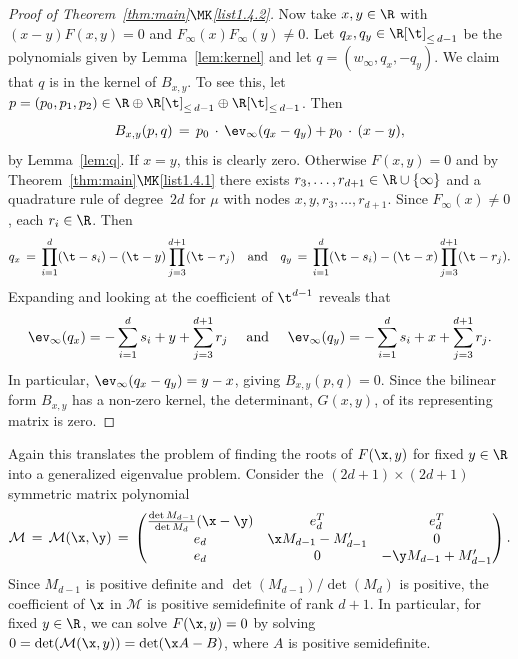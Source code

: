 \begin{proof}[Proof of Theorem~\ref{thm:main}$\MK$\eqref{list1.4.2}]
Now take $x, y\in \R$ with $(x-y)F(x,y)=0$ and $F_{\infty}(x)F_{\infty}(y)\neq 0$. Let $q_x, q_y\in \R[\t]_{\leq\,d-1}$ be the polynomials given by Lemma~\ref{lem:kernel} and let $q = (w_{\infty}, q_x, -q_y)$. We claim that $q$ is in the kernel of $B_{x,y}$. To see this, let $p = (p_0, p_1, p_2)\in \R\oplus \R[\t]_{\leq\,d-1} \oplus \R[\t]_{\leq\,d-1}$. Then
\[
B_{x,y}(p,q) \, = \, p_0\,\cdot\,\ev_{\infty}(q_x-q_y) +p_0\,\cdot\,(x-y),
\]
by Lemma~\ref{lem:q}. If $x=y$, this is clearly zero. Otherwise $F(x,y)=0$ and by Theorem~\ref{thm:main}$\MK$\eqref{list1.4.1} there exists $r_3, \hdots, r_{d+1}\in \R \cup \{\infty\}$ and a quadrature rule of degree~$2d$ for $\mu$ with nodes $x,y,r_3, \hdots,r_{d+1}$. Since $F_{\infty}(x)\neq 0$, each $r_i\in \R$. Then
\[
q_x \, = \, \prod_{i=1}^{d}(\t-s_i) - (\t-y)\prod_{j=3}^{d+1}(\t-r_j)
\quad \text{and} \quad q_y \, = \, \prod_{i=1}^{d}(\t-s_i) - (\t-x)\prod_{j=3}^{d+1}(\t-r_j).
\]
Expanding and looking at the coefficient of $\t^{d-1}$ reveals that
\[
\ev_{\infty}(q_x) = -\sum_{i=1}^d s_i + y+ \sum_{j=3}^{d+1} r_j
\quad \text{ and } \quad
\ev_{\infty}(q_y) = -\sum_{i=1}^d s_i + x+ \sum_{j=3}^{d+1} r_j.
\]
In particular, $\ev_{\infty}(q_x -q_y) = y-x$, giving $B_{x,y}(p,q)=0$. Since the bilinear form $B_{x,y}$ has a non-zero kernel, the determinant, $G(x,y)$, of its representing matrix is zero.
\end{proof}

\begin{rema}\label{rem:GenEigLinear}
Again this translates the problem of finding the roots of $F(\x,y)$ for fixed $y\in \R$ into a generalized eigenvalue problem. Consider the $(2d+1)\times (2d+1)$ symmetric matrix polynomial
\[
\mathcal{M} \, = \, \mathcal{M}(\x, \y) \, = \,
\begin{pmatrix}
\frac{\det M_{d-1}}{\det M_d} (\x-\y) &e_d^T&e_d^T\\
e_d&\x M_{d-1}-M_{d-1}'&0\\
e_d&0&-\y M_{d-1}+M_{d-1}'
\end{pmatrix}.
\]
Since $M_{d-1}$ is positive definite and $\det(M_{d-1})/\det(M_d)$ is positive, the coefficient of $\x$ in $\mathcal{M}$ is positive semidefinite of rank $d+1$. In particular, for fixed $y\in \R$, we can solve $F(\x,y)=0$ by solving $0=\det(\mathcal{M}(\x,y)) = \det(\x A-B)$, where $A$ is positive semidefinite.
\end{rema}



